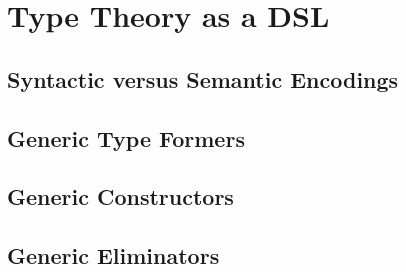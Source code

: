 \documentclass[12pt]{report}
\theoremstyle{definition}
\theoremstyle{remark}
\numberwithin{definition}{section}
\numberwithin{equation}{section}
\numberwithin{proposition}{section}
\numberwithin{conjecture}{section}
\numberwithin{theorem}{section}
\numberwithin{lemma}{section}
\numberwithin{corollary}{section}
\numberwithin{example}{section}
\numberwithin{remark}{section}
\begin{document}

\chapter{Type Theory as a DSL}\label{ch:gelim}

\section{Syntactic versus Semantic Encodings}
\section{Generic Type Formers}
\section{Generic Constructors}
\section{Generic Eliminators}
\end{document}
